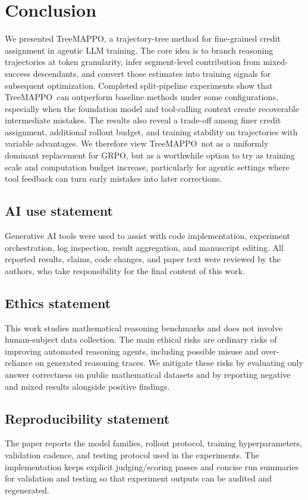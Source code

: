 \documentclass{article}
\newcommand{\ours}{TreeMAPPO\xspace}
\begin{document}
\section{Conclusion}
We presented \ours, a trajectory-tree method for fine-grained credit assignment in agentic LLM training. The core idea is to branch reasoning trajectories at token granularity, infer segment-level contribution from mixed-success descendants, and convert those estimates into training signals for subsequent optimization. Completed split-pipeline experiments show that \ours\ can outperform baseline methods under some configurations, especially when the foundation model and tool-calling context create recoverable intermediate mistakes. The results also reveal a trade-off among finer credit assignment, additional rollout budget, and training stability on trajectories with variable advantages. We therefore view \ours\ not as a uniformly dominant replacement for GRPO, but as a worthwhile option to try as training scale and computation budget increase, particularly for agentic settings where tool feedback can turn early mistakes into later corrections.

\subsection*{AI use statement}
Generative AI tools were used to assist with code implementation, experiment orchestration, log inspection, result aggregation, and manuscript editing. All reported results, claims, code changes, and paper text were reviewed by the authors, who take responsibility for the final content of this work.

\subsection*{Ethics statement}
This work studies mathematical reasoning benchmarks and does not involve human-subject data collection. The main ethical risks are ordinary risks of improving automated reasoning agents, including possible misuse and over-reliance on generated reasoning traces. We mitigate these risks by evaluating only answer correctness on public mathematical datasets and by reporting negative and mixed results alongside positive findings.

\subsection*{Reproducibility statement}
The paper reports the model families, rollout protocol, training hyperparameters, validation cadence, and testing protocol used in the experiments. The implementation keeps explicit judging/scoring passes and concise run summaries for validation and testing so that experiment outputs can be audited and regenerated.
\end{document}
